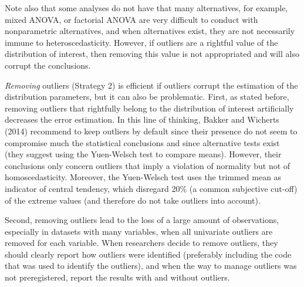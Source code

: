 \documentclass[man,floatsintext]{apa6}
\begin{document}
Note also that some analyses do not have that many alternatives, for example, mixed ANOVA, or factorial ANOVA are very difficult to conduct with nonparametric alternatives, and when alternatives exist, they are not necessarily immune to heteroscedasticity. However, if outliers are a rightful value of the distribution of interest, then removing this value is not appropriated and will also corrupt the conclusions.

\emph{Removing} outliers (Strategy 2) is efficient if outliers corrupt the estimation of the distribution parameters, but it can also be problematic. First, as stated before, removing outliers that rightfully belong to the distribution of interest artificially decreases the error estimation. In this line of thinking, Bakker and Wicherts (2014) recommend to keep outliers by default since their presence do not seem to compromise much the statistical conclusions and since alternative tests exist (they suggest using the Yuen-Welsch test to compare means). However, their conclusions only concern outliers that imply a violation of normality but not of homoscedasticity. Moreover, the Yuen-Welsch test uses the trimmed mean as indicator of central tendency, which disregard 20\% (a common subjective cut-off) of the extreme values (and therefore do not take outliers into account).

Second, removing outliers lead to the loss of a large amount of observations, especially in datasets with many variables, when all univariate outliers are removed for each variable. When researchers decide to remove outliers, they should clearly report how outliers were identified (preferably including the code that was used to identify the outliers), and when the way to manage outliers was not preregistered, report the results with and without outliers.
\end{document}
